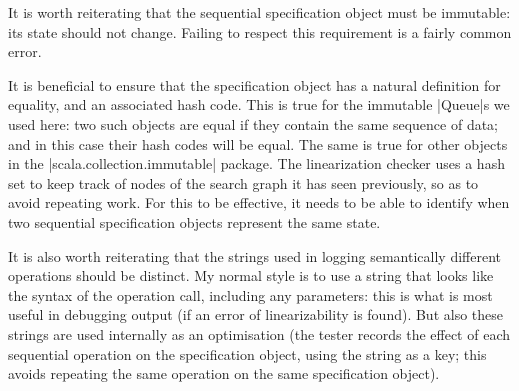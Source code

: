It is worth reiterating that the sequential specification object must be
immutable: its state should not change.  Failing to respect this requirement
is a fairly common error.

It is beneficial to ensure that the specification object has a natural
definition for equality, and an associated hash code.  This is true for the
immutable |Queue|s we used here: two such objects are equal if they contain
the same sequence of data; and in this case their hash codes will be equal.
The same is true for other objects in the |scala.collection.immutable|
package.  The linearization checker uses a hash set to keep track of nodes of
the search graph it has seen previously, so as to avoid repeating work.  For
this to be effective, it needs to be able to identify when two sequential
specification objects represent the same state.

It is also worth reiterating that the strings used in logging semantically
different operations should be distinct.  My normal style is to use a string
that looks like the syntax of the operation call, including any parameters:
this is what is most useful in debugging output (if an error of
linearizability is found).  But also these strings are used internally as an
optimisation (the tester records the effect of each sequential operation on the
specification object, using the string as a key; this avoids repeating the
same operation on the same specification object).


